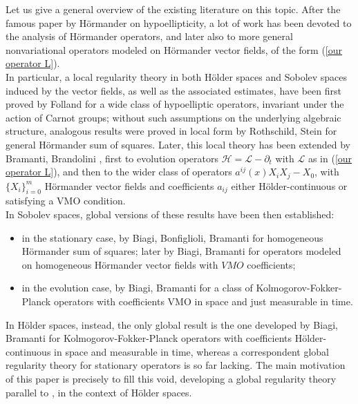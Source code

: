 \documentclass{article}
\numberwithin{equation}{section}
\begin{document}
\hspace{-7mm} Let us give a general overview of the existing literature on this topic. After the famous paper by Hörmander \cite{Hörmander's holy graal} on hypoellipticity, a lot of work has been devoted to the analysis of Hörmander operators, and later also to more general nonvariational operators modeled on Hörmander vector fields, of the form (\ref{our operator L}). \\
In particular, a local regularity theory in both Hölder spaces and Sobolev spaces induced by the vector fields, as well as the associated estimates,
have been first proved by Folland \cite{Fo2} for a wide class of hypoelliptic operators, invariant under the action of Carnot groups; without such assumptions on the underlying algebraic structure, analogous results were proved in local form by Rothschild, Stein \cite{R.S. lifting} for general Hörmander sum of squares. Later, this local theory has been extended by Bramanti, Brandolini \cite{Hölder spaces: original vs lifted}, \cite{librone} first to evolution operators $\mathcal{H}=\mathcal{L}-\partial_t$ with $\mathcal{L}$ as in (\ref{our operator L}), and then to the wider class of operators $a^{ij}(x) X_i X_j - X_0$, with $\{X_i\}_{i=0}^m$ Hörmander vector fields and coefficients $a_{ij}$ either Hölder-continuous or satisfying a VMO condition.\\
In Sobolev spaces, global versions of these results have been then established:
\begin{itemize}
    \item in the stationary case, by Biagi, Bonfiglioli, Bramanti \cite{Global Sobolev est for SS} for homogeneous Hörmander sum of squares; later by Biagi, Bramanti \cite{Global Sobolev est with a_ij} for operators modeled on homogeneous Hörmander vector fields with $VMO$ coefficients; 
    \item in the evolution case, by Biagi, Bramanti \cite{Global Sobolev est KFP} for a class of Kolmogorov-Fokker-Planck operators with coefficients VMO in space and just measurable in time.
\end{itemize}
In Hölder spaces, instead, the only global result is the one developed by Biagi, Bramanti \cite{Hölder est Kolmogorov} for Kolmogorov-Fokker-Planck operators with coefficients Hölder-continuous in space and measurable in time, whereas a correspondent global regularity theory for stationary operators is so far lacking. The main motivation of this paper is precisely to fill this void, developing a global regularity theory parallel to \cite{Global Sobolev est for SS}, \cite{Global Sobolev est with a_ij} in the context of Hölder spaces.
\end{document}
